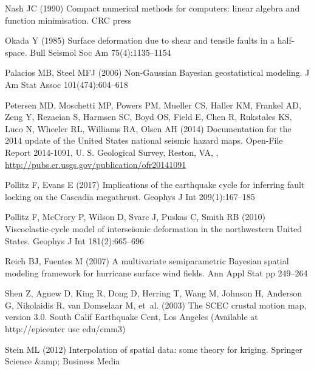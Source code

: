 {\begin{thebibliography}{33}
Nash JC (1990) Compact numerical methods for computers: linear algebra and
  function minimisation. {CRC} press

Okada Y (1985) Surface deformation due to shear and tensile faults in a
  half-space. Bull Seismol Soc Am 75(4):1135--1154

Palacios MB, Steel MFJ (2006) Non-{G}aussian {B}ayesian geostatistical
  modeling. J Am Stat Assoc 101(474):604--618

Petersen MD, Moschetti MP, Powers PM, Mueller CS, Haller KM, Frankel AD, Zeng
  Y, Rezaeian S, Harmsen SC, Boyd OS, Field E, Chen R, Rukstales KS, Luco N,
  Wheeler RL, Williams RA, Olsen AH (2014) Documentation for the 2014 update of
  the {U}nited {S}tates national seismic hazard maps. Open-File Report
  2014-1091, U. S. Geological Survey, Reston, VA, ,
  \urlprefix\url{http://pubs.er.usgs.gov/publication/ofr20141091}

Pollitz F, Evans E (2017) Implications of the earthquake cycle for inferring
  fault locking on the {C}ascadia megathrust. Geophys J Int 209(1):167--185

Pollitz F, McCrory P, Wilson D, Svarc J, Puskas C, Smith RB (2010)
  Viscoelastic-cycle model of interseismic deformation in the northwestern
  {U}nited {S}tates. Geophys J Int 181(2):665--696

Reich BJ, Fuentes M (2007) A multivariate semiparametric {B}ayesian spatial
  modeling framework for hurricane surface wind fields. Ann Appl Stat pp
  249--264

Shen Z, Agnew D, King R, Dong D, Herring T, Wang M, Johnson H, Anderson G,
  Nikolaidis R, van Domselaar M, et~al. (2003) The {SCEC} crustal motion map,
  version 3.0. South Calif Earthquake Cent, Los Angeles (Available at
  http://epicenter usc edu/cmm3)

Stein ML (2012) Interpolation of spatial data: some theory for kriging.
  Springer Science \&amp; Business Media


\end{thebibliography}}
